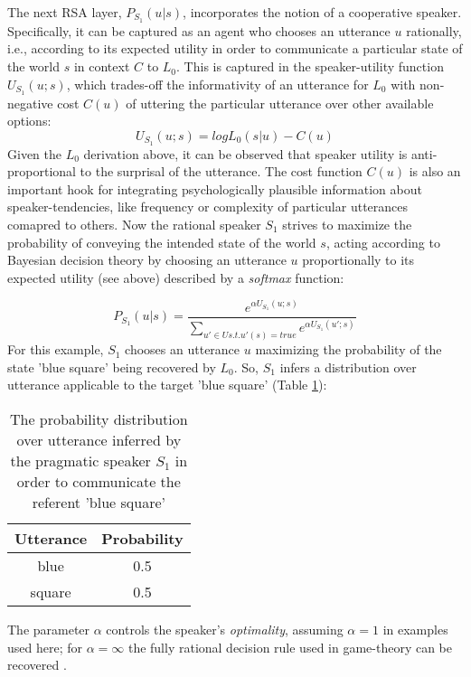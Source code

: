 The next RSA layer, $P_{S_1}(u | s)$, incorporates the notion of a cooperative speaker. Specifically, it can be captured as an agent who chooses an utterance $u$ rationally, i.e., according to its expected utility in order to communicate a particular state of the world $s$ in context $C$ to $L_0$. This is captured in the speaker-utility function $U_{S_1}(u; s)$, which trades-off the informativity of an utterance for $L_0$ with non-negative cost $C(u)$ of uttering the particular utterance over other available options:
$$U_{S_1} (u;s) = log L_0(s | u) - C(u)$$
Given the $L_0$ derivation above, it can be observed that speaker utility is anti-proportional to the surprisal of the utterance. %
The cost function $C(u)$ is also an important hook for integrating psychologically plausible information about speaker-tendencies, like frequency or complexity of particular utterances comapred to others. Now the rational speaker $S_1$ strives to maximize the probability of conveying the intended state of the world $s$, acting according to Bayesian decision theory by choosing an utterance $u$ proportionally to its expected utility (see above) described by a \emph{softmax} function:

$$P_{S_1}(u | s) = \frac{e^{\alpha U_{S_1} (u; s)}}{\sum_{u' \in U s.t. u'(s) = true} e^{\alpha U_{S_1} (u'; s)}}$$
For this example, $S_1$ chooses an utterance $u$ maximizing the probability of the state 'blue square' being recovered by $L_0$. So, $S_1$ infers a distribution over utterance applicable to the target 'blue square' (Table \ref{rsa-s1}):

\begin{table}[h]
	\begin{center}
		\caption{The probability distribution over utterance inferred by the pragmatic speaker $S_1$ in order to communicate the referent 'blue square'}
		\label{rsa-s1}
		\vskip 0.12in
		\begin{tabular}{cc}
			Utterance & Probability \\
			\hline
			blue & 0.5 \\
			square & 0.5
		\end{tabular}
	\end{center}
\end{table}
The parameter $\alpha$ controls the speaker's \emph{optimality}, assuming $\alpha = 1$ in examples used here; for $\alpha = \infty $ the fully rational decision rule used in game-theory can be recovered \parencite{problang, lassiter2017adjectival}.
 
